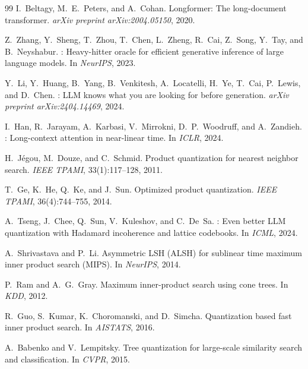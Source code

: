 \documentclass[10pt,twocolumn]{article}
\theoremstyle{definition}
\begin{document}
\begin{thebibliography}{99}
I.~Beltagy, M.~E.~Peters, and A.~Cohan.
\newblock Longformer: The long-document transformer.
\newblock \emph{arXiv preprint arXiv:2004.05150}, 2020.

Z.~Zhang, Y.~Sheng, T.~Zhou, T.~Chen, L.~Zheng, R.~Cai, Z.~Song, Y.~Tay,
  and B.~Neyshabur.
: Heavy-hitter oracle for efficient generative inference of
  large language models.
\newblock In \emph{NeurIPS}, 2023.

Y.~Li, Y.~Huang, B.~Yang, B.~Venkitesh, A.~Locatelli, H.~Ye, T.~Cai,
  P.~Lewis, and D.~Chen.
: {LLM} knows what you are looking for before generation.
\newblock \emph{arXiv preprint arXiv:2404.14469}, 2024.

I.~Han, R.~Jarayam, A.~Karbasi, V.~Mirrokni, D.~P.~Woodruff, and
  A.~Zandieh.
: Long-context attention in near-linear time.
\newblock In \emph{ICLR}, 2024.

H.~J\'{e}gou, M.~Douze, and C.~Schmid.
\newblock Product quantization for nearest neighbor search.
\newblock \emph{IEEE TPAMI}, 33(1):117--128, 2011.

T.~Ge, K.~He, Q.~Ke, and J.~Sun.
\newblock Optimized product quantization.
\newblock \emph{IEEE TPAMI}, 36(4):744--755, 2014.

A.~Tseng, J.~Chee, Q.~Sun, V.~Kuleshov, and C.~De~Sa.
: Even better {LLM} quantization with {H}adamard incoherence
  and lattice codebooks.
\newblock In \emph{ICML}, 2024.

A.~Shrivastava and P.~Li.
\newblock Asymmetric {LSH} ({ALSH}) for sublinear time maximum inner product
  search ({MIPS}).
\newblock In \emph{NeurIPS}, 2014.

P.~Ram and A.~G.~Gray.
\newblock Maximum inner-product search using cone trees.
\newblock In \emph{KDD}, 2012.

R.~Guo, S.~Kumar, K.~Choromanski, and D.~Simcha.
\newblock Quantization based fast inner product search.
\newblock In \emph{AISTATS}, 2016.

A.~Babenko and V.~Lempitsky.
\newblock Tree quantization for large-scale similarity search and
  classification.
\newblock In \emph{CVPR}, 2015.

\end{thebibliography}
\end{document}

